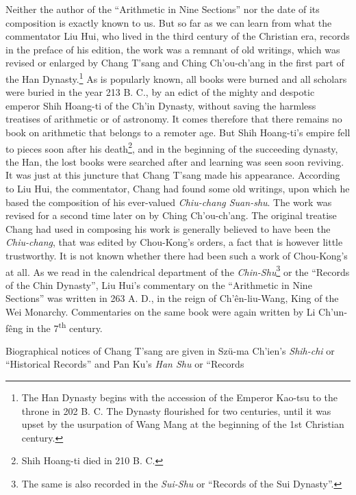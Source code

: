 \documentclass[11pt]{article}
\newcommand{\scanfooter}{}
\begin{document}
Neither the author of the ``Arithmetic in Nine Sections'' nor the date of its composition is exactly known to us. But so far as we can learn from what the commentator Liu Hui, who lived in the third century of the Christian era, records in the preface of his edition, the work was a remnant of old writings, which was revised or enlarged by Chang T'sang and Ching Ch'ou-ch'ang in the first part of the Han Dynasty.\footnote{The Han Dynasty begins with the accession of the Emperor Kao-tsu to the throne in 202 B. C. The Dynasty flourished for two centuries, until it was upset by the usurpation of Wang Mang at the beginning of the 1st Christian century.} As is popularly known, all books were burned and all scholars were buried in the year 213 B. C., by an edict of the mighty and despotic emperor Shih Hoang-ti of the Ch'in Dynasty, without saving the harmless treatises of arithmetic or of astronomy. It comes therefore that there remains no book on arithmetic that belongs to a remoter age. But Shih Hoang-ti's empire fell to pieces soon after his death\footnote{Shih Hoang-ti died in 210 B. C.}, and in the beginning of the succeeding dynasty, the Han, the lost books were searched after and learning was seen soon reviving. It was just at this juncture that Chang T'sang made his appearance. According to Liu Hui, the commentator, Chang had found some old writings, upon which he based the composition of his ever-valued \emph{Chiu-chang Suan-shu}. The work was revised for a second time later on by Ching Ch'ou-ch'ang. The original treatise Chang had used in composing his work is generally believed to have been the \emph{Chiu-chang}, that was edited by Chou-Kong's orders, a fact that is however little trustworthy. It is not known whether there had been such a work of Chou-Kong's at all. As we read in the calendrical department of the \emph{Chin-Shu}\footnote{The same is also recorded in the \emph{Sui-Shu} or ``Records of the Sui Dynasty''.} or the ``Records of the Chin Dynasty'', Liu Hui's commentary on the ``Arithmetic in Nine Sections'' was written in 263 A. D., in the reign of Ch'ên-liu-Wang, King of the Wei Monarchy. Commentaries on the same book were again written by Li Ch'un-fêng in the 7\textsuperscript{th} century.

Biographical notices of Chang T'sang are given in Szü-ma Ch'ien's \emph{Shih-chi} or ``Historical Records'' and Pan Ku's \emph{Han Shu} or ``Records
\scanfooter
\end{document}
